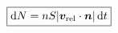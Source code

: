 \documentclass[border=2.5pt]{standalone}
\begin{document}
$\displaystyle \boxed{\mathrm dN=nS|\bm v_{\rm rel}\cdot\bm n|\,\mathrm dt}$
\end{document}
